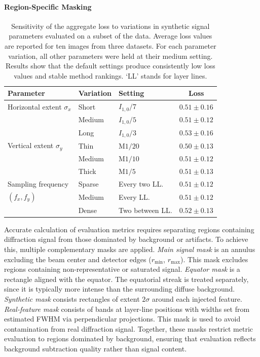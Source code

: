 \documentclass[iucr]{iucrjournals}
\begin{document}
\paragraph{Region-Specific Masking}
\label{sec:masking}
\begin{table}
\caption{Sensitivity of the aggregate loss to variations in synthetic signal parameters evaluated on a subset of the data.
Average loss values are reported for ten images from three datasets.
For each parameter variation, all other parameters were held at their medium setting.
Results show that the default settings produce consistently low loss values and stable method rankings. `LL' stands for layer lines.}
\label{tab:variations}
\centering
\tiny
\setlength{\tabcolsep}{4pt}
\renewcommand{\arraystretch}{1.0}
\begin{tabularx}{\linewidth}{@{}>{\RaggedRight}Xl>{\RaggedRight}Xc@{}}
\toprule
\textbf{Parameter} & \textbf{Variation} & \textbf{Setting} & \textbf{Loss} \\ \midrule
Horizontal extent $\sigma_x$ & Short & $I_{1,0}/7$ & $0.51 \pm 0.16$ \\
& Medium & $I_{1,0}/5$ & $0.51 \pm 0.12$ \\
& Long & $I_{1,0}/3$ & $0.53 \pm 0.16$ \\ \midrule
Vertical extent $\sigma_y$ & Thin & $\mathrm{M1}/20$ & $0.50 \pm 0.13$ \\
& Medium & $\mathrm{M1}/10$ & $0.51 \pm 0.12$ \\
& Thick & $\mathrm{M1}/5$ & $0.51 \pm 0.13$  \\ \midrule
Sampling frequency & Sparse & Every two LL. & $0.51 \pm 0.12$ \\
$(f_x, f_y)$ & Medium & Every LL. & $0.51 \pm 0.12$ \\
& Dense & Two between LL. & $0.52 \pm 0.13$ \\
\bottomrule
\end{tabularx}
\end{table}
Accurate calculation of evaluation metrics requires separating regions containing diffraction signal from those dominated by background or artifacts. To achieve this, multiple complementary masks are applied. \textit{Main signal mask} is an annulus excluding the beam center and detector edges ($r_{\mathrm{min}}$, $r_{\mathrm{max}}$). This mask excludes regions containing non-representative or saturated signal. \textit{Equator mask} is a rectangle aligned with the equator. The equatorial streak is treated separately, since it is typically more intense than the surrounding diffuse background. \textit{Synthetic mask} consists rectangles of extent $2\sigma$ around each injected feature. \textit{Real-feature mask} consists of bands at layer-line positions with widths set from estimated FWHM via perpendicular projections. This mask is used to avoid contamination from real diffraction signal. Together, these masks restrict metric evaluation to regions dominated by background, ensuring that evaluation reflects background subtraction quality rather than signal content.
\end{document}
